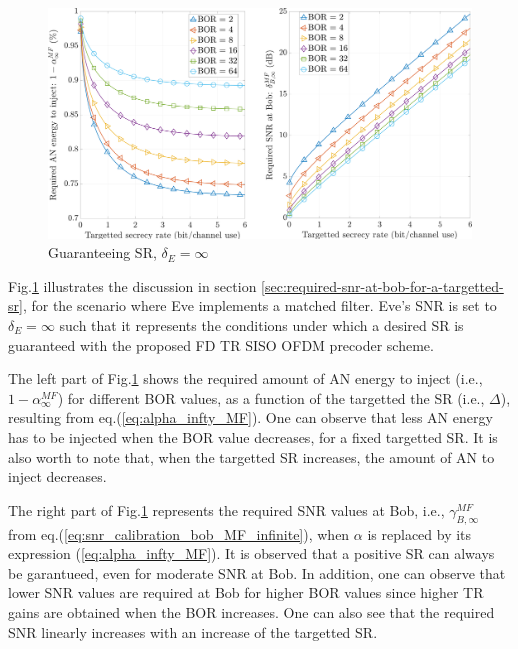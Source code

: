 \documentclass[12pt, draftclsnofoot, onecolumn]{IEEEtran}
\let\MYoriglatexcaption\caption
\renewcommand{\caption}[2][\relax]{\MYoriglatexcaption[#2]{#2}}
\begin{document}
\begin{figure}[h!t]
	\centering
	\captionsetup{justification=centering}
	\includegraphics[width=0.75\linewidth]{graphs/SR_guarantee.pdf}
	\caption{Guaranteeing SR, $\delta_E = \infty$}
	\label{fig_targettedSR}
\end{figure} 
Fig.\ref{fig_targettedSR} illustrates the discussion in section \ref{sec:required-snr-at-bob-for-a-targetted-sr}, for the scenario where Eve implements a matched filter. Eve's SNR is set to $\delta_E = \infty$ such that it represents the conditions under which a desired SR is guaranteed with the proposed FD TR SISO OFDM precoder scheme.

The left part of Fig.\ref{fig_targettedSR} shows the required amount of AN energy to inject (i.e., $1-\alpha_{\infty}^{MF}$) for different BOR values, as a function of the targetted the SR (i.e., $\Delta$), resulting from eq.(\ref{eq:alpha_infty_MF}). One can observe that less AN energy has to be injected when the BOR value decreases, for a fixed targetted SR. It is also worth to note that, when the targetted SR increases, the amount of AN to inject decreases. 

The right part of Fig.\ref{fig_targettedSR} represents the required SNR values at Bob, i.e., $\gamma_{B,\infty}^{MF}$ from eq.(\ref{eq:snr_calibration_bob_MF_infinite}), when $\alpha$ is replaced by its expression (\ref{eq:alpha_infty_MF}). It is observed that a positive SR can always be garantueed, even for moderate SNR at Bob. In addition, one can observe that lower SNR values are required at Bob for higher BOR values since higher TR gains are obtained when the BOR increases. One can also see that the required SNR linearly increases with an increase of the targetted SR. 
\end{document}
